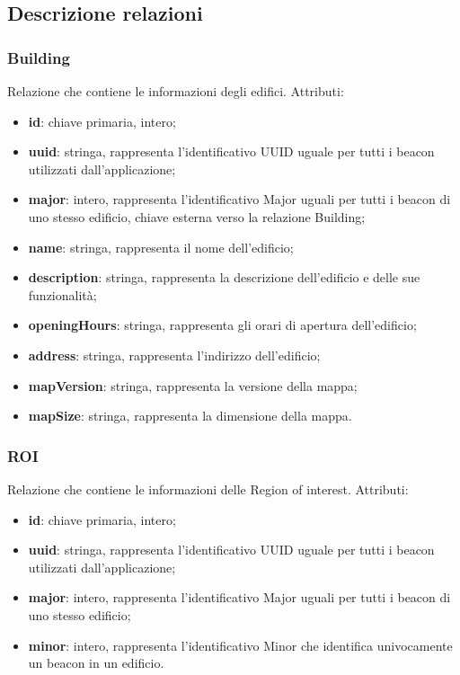 \documentclass[../ManualeSviluppatore.tex]{subfiles}
\begin{document}
	\subsection{Descrizione relazioni}
		\subsubsection{Building}
		Relazione che contiene le informazioni degli edifici. Attributi:
		\begin{itemize}
			\item \textbf{id}: chiave primaria, intero;
			\item \textbf{uuid}: stringa, rappresenta l'identificativo UUID uguale per tutti i beacon utilizzati dall'applicazione;
			\item \textbf{major}: intero, rappresenta l'identificativo Major uguali per tutti i beacon di uno stesso edificio, chiave esterna verso la relazione Building;
			\item \textbf{name}: stringa, rappresenta il nome dell'edificio;
			\item \textbf{description}: stringa, rappresenta la descrizione dell'edificio e delle sue funzionalità;
			\item \textbf{openingHours}: stringa, rappresenta gli orari di apertura dell'edificio;
			\item \textbf{address}: stringa, rappresenta l'indirizzo dell'edificio;
			\item \textbf{mapVersion}: stringa, rappresenta la versione della mappa;
			\item \textbf{mapSize}: stringa, rappresenta la dimensione della mappa.
		\end{itemize}
		\subsubsection{ROI}
		Relazione che contiene le informazioni delle Region of interest. Attributi:
			\begin{itemize}
			\item \textbf{id}: chiave primaria, intero;
			\item \textbf{uuid}: stringa, rappresenta l'identificativo UUID uguale per tutti i beacon utilizzati dall'applicazione;
			\item \textbf{major}: intero, rappresenta l'identificativo Major uguali per tutti i beacon di uno stesso edificio;
			\item \textbf{minor}: intero, rappresenta l'identificativo Minor che identifica univocamente un beacon in un edificio.
			\end{itemize}
\end{document}
